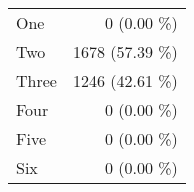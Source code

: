\begin{tabular}{ l  r }
One & 0 (0.00 \%)\\
Two & 1678 (57.39 \%)\\
Three & 1246 (42.61 \%)\\
Four & 0 (0.00 \%)\\
Five & 0 (0.00 \%)\\
Six & 0 (0.00 \%)\\
\end{tabular}